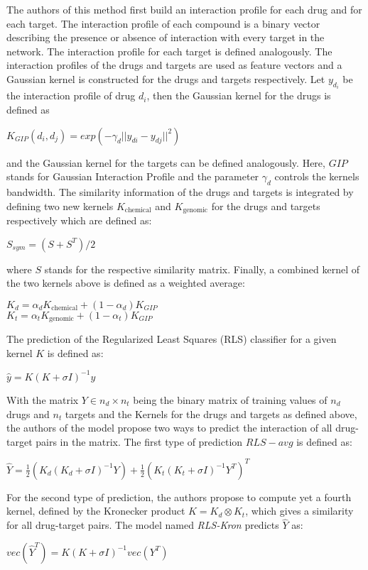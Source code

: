 The authors of this method first build an interaction profile for each drug and for each target. The interaction profile of each compound is a binary vector describing the presence or absence of interaction with every target in the network. The interaction profile for each target is defined analogously. The interaction profiles of the drugs and targets are used as feature vectors and a Gaussian kernel is constructed for the drugs and targets respectively. Let $y_{d_i}$ be the interaction profile of drug $d_i$, then the Gaussian kernel for the drugs is defined as
\begin{center}
$K_{GIP}(d_i,d_j) = exp(-\gamma_d || y_{di}-y_{dj} ||^2)$
\end{center}
and the Gaussian kernel for the targets can be defined analogously. Here, $GIP$ stands for Gaussian Interaction Profile and the parameter $\gamma_d$ controls the kernels bandwidth. The similarity information of the drugs and targets is integrated by defining two new kernels $K_{\text{chemical}}$ and $K_{\text{genomic}}$ for the drugs and targets respectively which are defined as:
\begin{center}
$S_{sym}=(S+S^T)/2$
\end{center}
where $S$ stands for the respective similarity matrix. Finally, a combined kernel of the two kernels above is defined as a weighted average:
\begin{center}
$K_d=\alpha_dK_{\text{chemical}}+(1-\alpha_d)K_{GIP}$\\
$K_t =\alpha_tK_{\text{genomic}}+(1-\alpha_t)K_{GIP}$
\end{center}
The prediction of the Regularized Least Squares (RLS) classifier for a given kernel $K$ is defined as:
\begin{center}
$\hat{y} = K(K+\sigma I)^{-1}y$
\end{center}
With the matrix $Y\in n_d \times n_t$ being the binary matrix of training values of $n_d$ drugs and $n_t$ targets and the Kernels for the drugs and targets as defined above, the authors of the model propose two ways to predict the interaction of all drug-target pairs in the matrix. The first type of prediction $RLS-avg$ is defined as:
\begin{center}
$\hat{Y}=\frac{1}{2}(K_d(K_d+\sigma I)^{-1}Y)+\frac{1}{2}(K_t(K_t+\sigma I)^{-1}Y^T)^T$
\end{center}
For the second type of prediction, the authors propose to compute yet a fourth kernel, defined by the Kronecker product $K = K_d \otimes K_t$, which gives a similarity for all drug-target pairs. The model named \textit{RLS-Kron} predicts $\hat{Y}$ as:
\begin{center}
$vec(\hat{Y}^T) = K(K+\sigma I)^{-1}vec(Y^T)$
\end{center}



